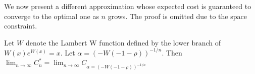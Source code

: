 
We now present a different approximation whose expected cost is guaranteed
to converge to the optimal one as $n$ grows.  The proof is omitted due to
the space constraint.

\begin{theorem}\label{theorem:approx1}
Let $W$ denote the Lambert W function defined by the lower branch of $W(x) e^{W(x)} = x$.
Let $\alpha = (-W(-1-\rho))^{-1/n}$.  Then 
$\lim_{n \rightarrow \infty} C^*_n = \lim_{n \rightarrow \infty} C_{\alpha = (-W(-1-\rho))^{-1/n}}$
\end{theorem}


